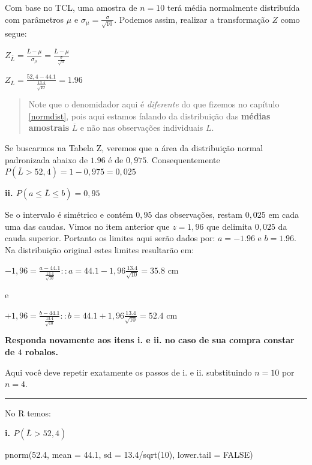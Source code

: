 \documentclass[
]{book}
\newenvironment{Shaded}{\begin{snugshade}}{\end{snugshade}}
\newcommand{\AttributeTok}[1]{\textcolor[rgb]{0.77,0.63,0.00}{#1}}
\newcommand{\ConstantTok}[1]{\textcolor[rgb]{0.00,0.00,0.00}{#1}}
\newcommand{\DecValTok}[1]{\textcolor[rgb]{0.00,0.00,0.81}{#1}}
\newcommand{\FloatTok}[1]{\textcolor[rgb]{0.00,0.00,0.81}{#1}}
\newcommand{\FunctionTok}[1]{\textcolor[rgb]{0.00,0.00,0.00}{#1}}
\newcommand{\NormalTok}[1]{#1}
\newcommand{\SpecialCharTok}[1]{\textcolor[rgb]{0.00,0.00,0.00}{#1}}
\begin{document}
Com base no TCL, uma amostra de \(n = 10\) terá média normalmente distribuída com parâmetros \(\mu\) e \(\sigma_{\mu} = \frac{\sigma}{\sqrt{10}}\). Podemos assim, realizar a transformação \(Z\) como segue:

\(Z_{\overline{L}} = \frac{\overline{L} - \mu}{\sigma_{\mu}} = \frac{\overline{L} - \mu}{\frac{\sigma}{\sqrt{n}}}\)

\(Z_{\overline{L}} = \frac{52,4 - 44.1}{\frac{13.4}{\sqrt{10}}} = 1.96\)

\begin{quote}
Note que o denomidador aqui é \emph{diferente} do que fizemos no capítulo \ref{normdist}, pois aqui estamos falando da distribuição das \textbf{médias amostrais} \(\overline{L}\) e não nas observações individuais \(L\).
\end{quote}

Se buscarmos na Tabela Z, veremos que a área da distribuição normal padronizada abaixo de \(1.96\) é de \(0,975\). Consequentemente \(P(\overline{L} > 52,4) = 1 - 0,975 = 0,025\)

\textbf{ii. \(P(a \le \overline{L} \le b) = 0,95\)}

Se o intervalo é simétrico e contém \(0,95\) das observações, restam \(0,025\) em cada uma das caudas. Vimos no item anterior que \(z = 1,96\) que delimita \(0,025\) da cauda superior. Portanto os limites aqui serão dados por: \(a = -1.96\) e \(b = 1.96\). Na distribuição original estes limites resultarão em:

\(-1,96 = \frac{a - 44.1}{\frac{13.4}{\sqrt{10}}}:: a = 44.1 -1,96 \frac{13.4}{\sqrt{10}} = 35.8\) cm

e

\(+1,96 = \frac{b - 44.1}{\frac{13.4}{\sqrt{10}}}:: b = 44.1 +1,96 \frac{13.4}{\sqrt{10}} = 52.4\) cm

\textbf{Responda novamente aos itens i. e ii. no caso de sua compra constar de \(4\) robalos.}

Aqui você deve repetir exatamente os passos de i. e ii. substituindo \(n = 10\) por \(n = 4\).

\begin{center}\rule{0.5\linewidth}{0.5pt}\end{center}

No R temos:

\textbf{i. \(P(\overline{L} > 52,4)\)}

\begin{Shaded}
\begin{Highlighting}[]
\FunctionTok{pnorm}\NormalTok{(}\FloatTok{52.4}\NormalTok{, }
      \AttributeTok{mean =} \FloatTok{44.1}\NormalTok{, }
      \AttributeTok{sd =} \FloatTok{13.4}\SpecialCharTok{/}\FunctionTok{sqrt}\NormalTok{(}\DecValTok{10}\NormalTok{), }
      \AttributeTok{lower.tail =} \ConstantTok{FALSE}\NormalTok{)}
\end{Highlighting}
\end{Shaded}
\end{document}
